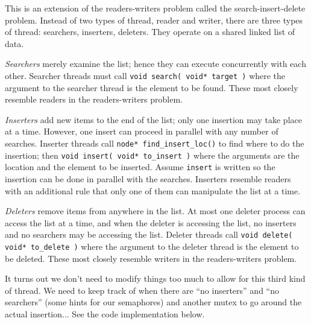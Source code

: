 This is an extension of the readers-writers problem called the search-insert-delete problem. Instead of two types of thread, reader and writer, there are three types of thread: searchers, inserters, deleters. They operate on a shared linked list of data. 

\textit{Searchers} merely examine the list; hence they can execute concurrently with each other. Searcher threads must call \texttt{void search( void* target )} where the argument to the searcher thread is the element to be found. These most closely resemble readers in the readers-writers problem. 

\textit{Inserters} add new items to the end of the list; only one insertion may take place at a time. However, one insert can proceed in parallel with any number of searches. Inserter threads call \texttt{node* find\_insert\_loc()} to find where to do the insertion; then \texttt{void insert( void* to\_insert )} where the arguments are the location and the element to be inserted. Assume \texttt{insert} is written so the insertion can be done in parallel with the searches. Inserters resemble readers with an additional rule that only one of them can manipulate the list at a time. 

\textit{Deleters} remove items from anywhere in the list. At most one deleter process can access the list at a time, and when the deleter is accessing the list, no inserters and no searchers may be accessing the list. Deleter threads call \texttt{void delete( void* to\_delete )} where the argument to the deleter thread is the element to be deleted. These most closely resemble writers in the readers-writers problem.

It turns out we don't need to modify things too much to allow for this third kind of thread. We need to keep track of when there are ``no inserters'' and ``no searchers'' (some hints for our semaphores) and another mutex to go around the actual insertion... See the code implementation below.

